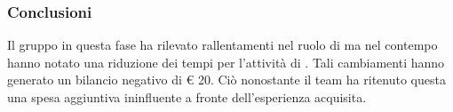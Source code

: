 		\subsubsection{Conclusioni}
			Il gruppo \groupname{} in questa fase ha rilevato rallentamenti nel ruolo di  ma nel contempo hanno notato una riduzione dei tempi per l'attività di . Tali cambiamenti hanno generato un bilancio negativo di \euro{} 20. Ciò nonostante il team ha ritenuto questa una spesa aggiuntiva ininfluente a fronte dell'esperienza acquisita. 
	
	
